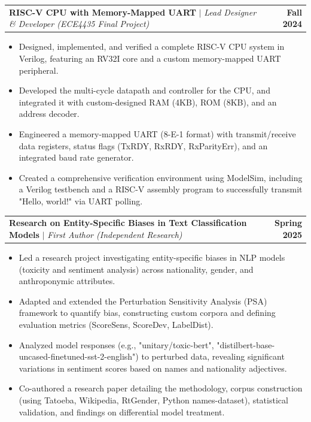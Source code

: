 \documentclass[letterpaper,11pt]{article}
\makeatletter
\newcommand{\resumeItem}[1]{
  \item\small{
    {#1 \vspace{-2pt}}
  }
}
\newcommand{\resumeProjectHeading}[2]{
    \item
    \begin{tabular*}{0.99\textwidth}{l@{\extracolsep{\fill}}r}
      \small#1 & \textbf{\small #2}\\
    \end{tabular*}\vspace{-5pt}
}
\newcommand{\resumeItemListStart}{\begin{itemize}}
\newcommand{\resumeItemListEnd}{\end{itemize}\vspace{-3pt}}
\makeatother
\begin{document}
        \resumeProjectHeading
            {\textbf{RISC-V CPU with Memory-Mapped UART} $|$ \emph{Lead Designer \& Developer (ECE4435 Final Project)}}{Fall 2024}
            \resumeItemListStart
                \resumeItem{Designed, implemented, and verified a complete RISC-V CPU system in Verilog, featuring an RV32I core and a custom memory-mapped UART peripheral.}
                \resumeItem{Developed the multi-cycle datapath and controller for the CPU, and integrated it with custom-designed RAM (4KB), ROM (8KB), and an address decoder.}
                \resumeItem{Engineered a memory-mapped UART (8-E-1 format) with transmit/receive data registers, status flags (TxRDY, RxRDY, RxParityErr), and an integrated baud rate generator.}
                \resumeItem{Created a comprehensive verification environment using ModelSim, including a Verilog testbench and a RISC-V assembly program to successfully transmit "Hello, world!" via UART polling.}
            \resumeItemListEnd
            \vspace{-12pt}

        \resumeProjectHeading
            {\textbf{Research on Entity-Specific Biases in Text Classification Models} $|$ \emph{First Author (Independent Research)}}{Spring 2025}
            \resumeItemListStart
                \resumeItem{Led a research project investigating entity-specific biases in NLP models (toxicity and sentiment analysis) across nationality, gender, and anthroponymic attributes.}
                \resumeItem{Adapted and extended the Perturbation Sensitivity Analysis (PSA) framework to quantify bias, constructing custom corpora and defining evaluation metrics (ScoreSens, ScoreDev, LabelDist).}
                \resumeItem{Analyzed model responses (e.g., "unitary/toxic-bert", "distilbert-base-uncased-finetuned-sst-2-english") to perturbed data, revealing significant variations in sentiment scores based on names and nationality adjectives.}
                \resumeItem{Co-authored a research paper detailing the methodology, corpus construction (using Tatoeba, Wikipedia, RtGender, Python names-dataset), statistical validation, and findings on differential model treatment.}
            \resumeItemListEnd
            \vspace{-12pt}
            
\end{document}
